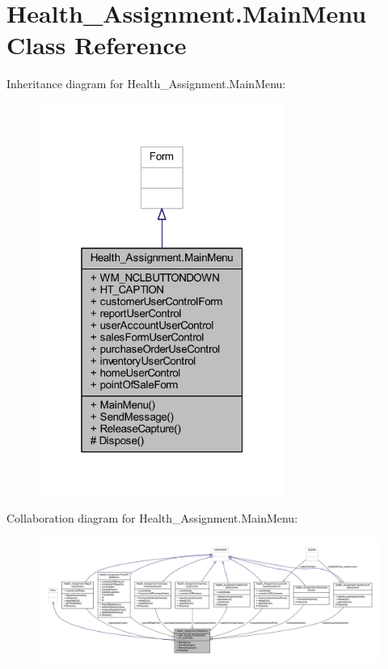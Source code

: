 \hypertarget{class_health___assignment_1_1_main_menu}{}\section{Health\+\_\+\+Assignment.\+Main\+Menu Class Reference}
\label{class_health___assignment_1_1_main_menu}


Inheritance diagram for Health\+\_\+\+Assignment.\+Main\+Menu\+:\nopagebreak
\begin{figure}[H]
\begin{center}
\leavevmode
\includegraphics[width=229pt]{class_health___assignment_1_1_main_menu__inherit__graph}
\end{center}
\end{figure}


Collaboration diagram for Health\+\_\+\+Assignment.\+Main\+Menu\+:\nopagebreak
\begin{figure}[H]
\begin{center}
\leavevmode
\includegraphics[width=350pt]{class_health___assignment_1_1_main_menu__coll__graph}
\end{center}
\end{figure}
